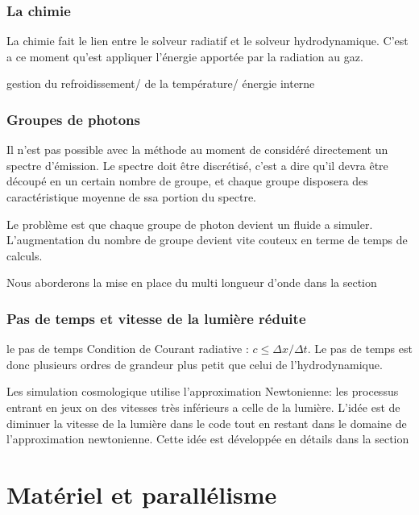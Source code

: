 \subsection{La chimie}

La chimie fait le lien entre le solveur radiatif et le solveur hydrodynamique.
C'est a ce moment qu'est appliquer l'énergie apportée par la radiation au gaz.


gestion du refroidissement/ de la température/ énergie interne


\subsection{Groupes de photons}
\label{sec:groupedephotons}

Il n'est pas possible avec la méthode au moment de considéré directement un spectre d'émission.
Le spectre doit être discrétisé, c'est a dire qu'il devra être découpé en un certain nombre de groupe, et chaque groupe disposera des caractéristique moyenne de ssa portion du spectre.

Le problème est que chaque groupe de photon devient un fluide a simuler. 
L'augmentation du nombre de groupe devient vite couteux en terme de temps de calculs.


Nous aborderons la mise en place du multi longueur d'onde dans la section %

\subsection{Pas de temps et vitesse de la lumière réduite}
le pas de temps
Condition de Courant radiative : $ c \leq \Delta x / \Delta t $.
Le pas de temps est donc plusieurs ordres de grandeur plus petit que celui de l'hydrodynamique.


Les simulation cosmologique utilise l'approximation Newtonienne: les processus entrant en jeux on des vitesses très inférieurs a celle de la lumière.
L'idée est de diminuer la vitesse de la lumière dans le code tout en restant dans le domaine de l'approximation newtonienne.
Cette idée est développée en détails dans la section %


\chapter{Matériel et parallélisme}

